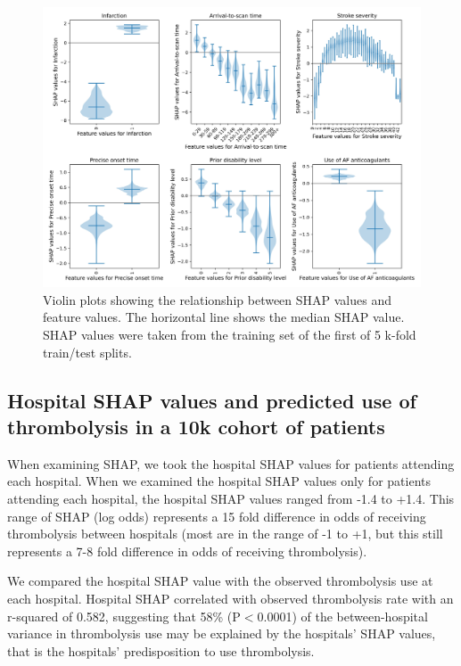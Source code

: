 \begin{itemize}
\begin{figure}
\centering
\includegraphics[width=1\textwidth]{./images/03_xgb_10_features_thrombolysis_shap_violin}
\caption{Violin plots showing the relationship between SHAP values and feature values. The horizontal line shows the median SHAP value. SHAP values were taken from the training set of the first of 5 k-fold train/test splits.}
\label{fig:results_shap_violin}
\end{figure}


\subsection{Hospital SHAP values and predicted use of thrombolysis in a 10k cohort of patients}

When examining SHAP, we took the hospital SHAP values for patients attending each hospital. When we examined the hospital SHAP values only for patients attending each hospital, the hospital SHAP values ranged from -1.4 to +1.4. This range of SHAP (log odds) represents a 15 fold difference in odds of receiving thrombolysis between hospitals (most are in the range of -1 to +1, but this still represents a 7-8 fold difference in odds of receiving thrombolysis).

We compared the hospital SHAP value with the observed thrombolysis use at each hospital. Hospital SHAP correlated with observed thrombolysis rate with an r-squared of 0.582, suggesting that 58\% (P$<$0.0001) of the between-hospital variance in thrombolysis use may be explained by the hospitals' SHAP values, that is the hospitals' predisposition to use thrombolysis.


\end{itemize}
